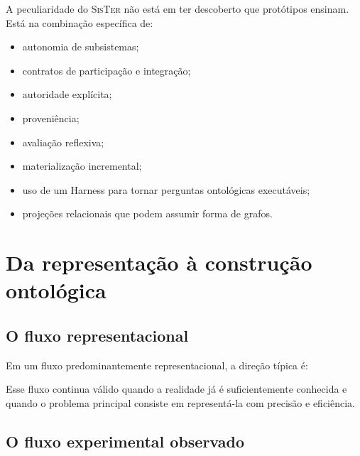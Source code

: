 \documentclass[11pt,a4paper,oneside]{article}
\newcommand{\sister}{\textsc{SisTer}}
\begin{document}
A peculiaridade do \sister{} não está em ter descoberto que protótipos ensinam. Está na combinação específica de:

\begin{itemize}
  \item autonomia de subsistemas;
  \item contratos de participação e integração;
  \item autoridade explícita;
  \item proveniência;
  \item avaliação reflexiva;
  \item materialização incremental;
  \item uso de um Harness para tornar perguntas ontológicas executáveis;
  \item projeções relacionais que podem assumir forma de grafos.
\end{itemize}

\section{Da representação à construção ontológica}

\subsection{O fluxo representacional}

Em um fluxo predominantemente representacional, a direção típica é:

\begin{center}
\end{center}

Esse fluxo continua válido quando a realidade já é suficientemente conhecida e quando o problema principal consiste em representá-la com precisão e eficiência.

\subsection{O fluxo experimental observado}
\end{document}
